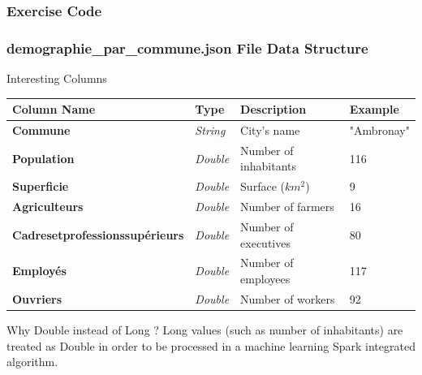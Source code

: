 \documentclass[slidetop,9pt,utf8]{beamer}
\begin{document}
\begin{CJK}{UTF8}{gbsn}
\begin{frame}
\end{frame}

\begin{frame}
  \frametitle{Exercise Code}

  

\end{frame}

\begin{frame}

  \frametitle{demographie\_par\_commune.json File Data Structure}

  \begin{block}{Interesting Columns}
    \begin{tabular}{|l|l|l|l|}
          \hline 
          \rowcolor{gray} \textbf{Column Name} & \textbf{Type} & \textbf{Description} & \textbf{Example} \\ \hline
          \textbf{Commune} & \textit{String} & City's name & "Ambronay" \\ \hline
          \textbf{Population} & \textit{Double} & Number of inhabitants & 116 \\ \hline
          \textbf{Superficie} & \textit{Double} & Surface ($km^{2}$) & 9 \\ \hline
          \textbf{Agriculteurs} & \textit{Double} & Number of farmers & 16 \\ \hline
          \textbf{Cadresetprofessionssupérieurs} & \textit{Double} & Number of executives & 80 \\ \hline
          \textbf{Employés} & \textit{Double} & Number of employees & 117 \\ \hline
          \textbf{Ouvriers} & \textit{Double} & Number of workers & 92 \\ \hline
    \end{tabular}
  \end{block}

  \begin{block}{Why Double instead of Long ?}
    Long values (such as number of inhabitants) are treated as Double in order to be processed in a machine learning Spark integrated algorithm.
  \end{block}

\end{frame}

\begin{frame}[fragile]


\end{frame}
\end{CJK}
\end{document}
